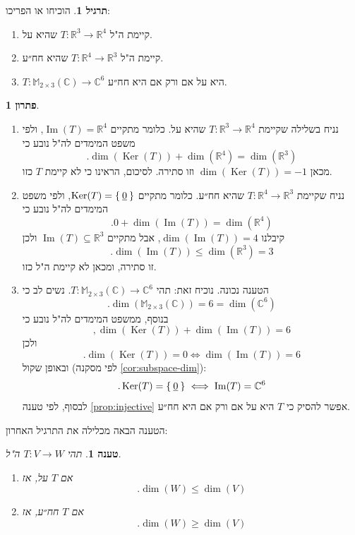 \documentclass[12pt]{report}
\theoremstyle{plain}
\newtheorem{proposition}[theorem]{טענה}
\theoremstyle{definition}
\newtheorem{exercise}{תרגיל}[chapter]
\newtheorem*{solution}{פתרון}
\newcommand{\R}{\mathbb{R}}
\newcommand{\C}{\mathbb{C}}
\newcommand{\M}{\mathbb{M}}
\newcommand{\0}{\mathbf{0}}
\DeclareMathOperator{\Ker}{Ker}
\DeclareMathOperator{\Image}{Im}
\begin{document}
\begin{exercise}
הוכיחו או הפריכו:
\begin{enumerate}[label=\alph*.]
\item 
קיימת ה"ל
$T:\R^3\to\R^4$
שהיא על.

\item
קיימת ה"ל
$T:\R^4\to\R^3$
שהיא חח״ע.

\item
$T:\M_{2\times 3}(\C)\to\C^6$
היא על אם ורק אם היא חח״ע.


\end{enumerate}
\end{exercise}

\begin{solution}\
\begin{enumerate}[label=\alph*.]
\item 
נניח בשלילה שקיימת
$T:\R^3\to\R^4$
שהיא על. כלומר מתקיים
$\Image(T)=\R^4$,
ולפי משפט המימדים לה"ל נובע כי
$$
.\dim(\Ker(T))+\dim(\R^4)=\dim(\R^3)
$$
מכאן
$\dim(\Ker(T))=-1$
וזו סתירה. לסיכום, הראינו כי לא קיימת 
$T$
כזו.


\item
נניח שקיימת
$T:\R^4\to\R^3$
שהיא חח״ע. כלומר מתקיים
$\Ker(T)=\Set{\underline{0}}$,
ולפי משפט המימדים לה"ל נובע כי
$$
.0+\dim(\Image(T))=\dim(\R^4)
$$
קיבלנו
$\dim(\Image(T))=4$,
אבל מתקיים
$\Image(T)\subseteq\R^3$
ולכן
$$.\dim(\Image(T))\leq\dim(\R^3)=3$$
זו סתירה, ומכאן לא קיימת ה"ל כזו.


\item 
הטענה נכונה. נוכיח זאת: תהי
$T:\M_{2\times 3}(\C)\to\C^6$.
נשים לב כי
$$
.\dim(\M_{2\times 3}(\C))=6=\dim(\C^6)
$$
בנוסף, ממשפט המימדים לה"ל נובע כי
$$
,\dim(\Ker(T))+\dim(\Image(T))=6
$$
ולכן
$$
.\dim(\Ker(T))=0 \iff \dim(\Image(T))=6
$$
ובאופן שקול (לפי מסקנה
\ref{cor:subspace-dim}):
$$
.\Ker(T)=\Set{\underline{0}} \iff \Image(T)=\C^6
$$
לבסוף, לפי טענה
\ref{prop:injective}
אפשר להסיק כי 
$T$
היא על אם ורק אם היא חח״ע.

\end{enumerate}
\end{solution}

הטענה הבאה מכלילה את התרגיל האחרון:

\begin{proposition}
תהי
$T:V\to W$
ה"ל. 
\begin{enumerate}[label=\alph*.]
\item
אם
$T$
על,
אז
$$
.\dim(W)\leq\dim(V)
$$


\item
אם
$T$
חח״ע,
אז
$$
.\dim(W)\geq\dim(V)
$$


\end{enumerate}
\end{proposition}
\end{document}
